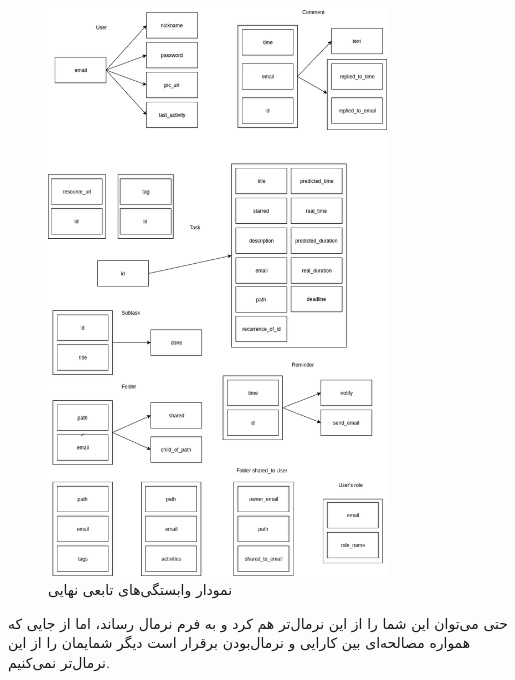 \documentclass{article}
\begin{document}
\begin{figure}[H]
  \centering  
  \includegraphics[width = 0.8\textwidth]{Fucntional_Dependancy2.png}
  \caption{نمودار وابستگی‌های تابعی نهایی}
  \label{fig:fd2}
\end{figure}
حتی می‌توان این شما را از این نرمال‌تر هم کرد و به فرم نرمال  رساند، اما از جایی که همواره مصالحه‌ای بین کارایی و نرمال‌بودن برقرار است دیگر شمایمان را از این نرمال‌تر نمی‌کنیم.
\end{document}
